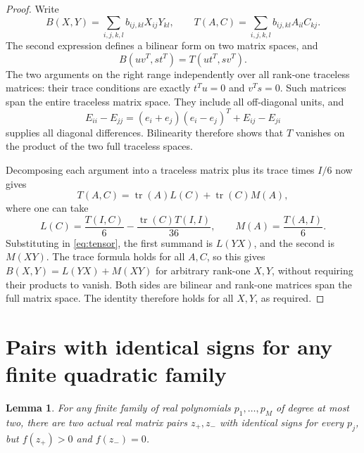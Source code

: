 \documentclass[11pt]{article}
\newcommand{\tr}{\operatorname{tr}}
\newtheorem{lemma}{Lemma}
\begin{document}
\begin{proof}
Write
\[
 B(X,Y)=\sum_{i,j,k,l}b_{ij,kl}X_{ij}Y_{kl},
 \qquad
 T(A,C)=\sum_{i,j,k,l}b_{ij,kl}A_{il}C_{kj}.
\]
The second expression defines a bilinear form on two matrix spaces,
and
\begin{equation}\label{eq:tensor}
 B(uv^T,st^T)=T(ut^T,sv^T).
\end{equation}
The two arguments on the right range independently over all rank-one
traceless matrices: their trace conditions are exactly
\(t^Tu=0\) and \(v^Ts=0\). Such matrices span the entire traceless
matrix space. They include all off-diagonal units, and
\[
 E_{ii}-E_{jj}
 =(e_i+e_j)(e_i-e_j)^T+E_{ij}-E_{ji}
\]
supplies all diagonal differences. Bilinearity therefore shows that
\(T\) vanishes on the product of the two full traceless spaces.

Decomposing each argument into a traceless matrix plus its trace
times \(I/6\) now gives
\[
 T(A,C)=\tr(A)L(C)+\tr(C)M(A),
\]
where one can take
\[
 L(C)=\frac{T(I,C)}6-\frac{\tr(C)T(I,I)}{36},
 \qquad M(A)=\frac{T(A,I)}6.
\]
Substituting in \eqref{eq:tensor}, the first summand is \(L(YX)\),
and the second is \(M(XY)\). The trace formula holds for all \(A,C\),
so this gives
\(B(X,Y)=L(YX)+M(XY)\) for arbitrary rank-one \(X,Y\), without
requiring their products to vanish. Both sides are bilinear and
rank-one matrices span the full matrix space. The identity therefore
holds for all \(X,Y\), as required.
\end{proof}

\section{Pairs with identical signs for any finite quadratic family}

\begin{lemma}\label{lem:pairs}
For any finite family of real polynomials \(p_1,\ldots,p_M\)
of degree at most two, there are two actual real matrix pairs
\(z_+,z_-\) with identical signs for every \(p_j\), but
\(f(z_+)>0\) and \(f(z_-)=0\).
\end{lemma}
\end{document}
